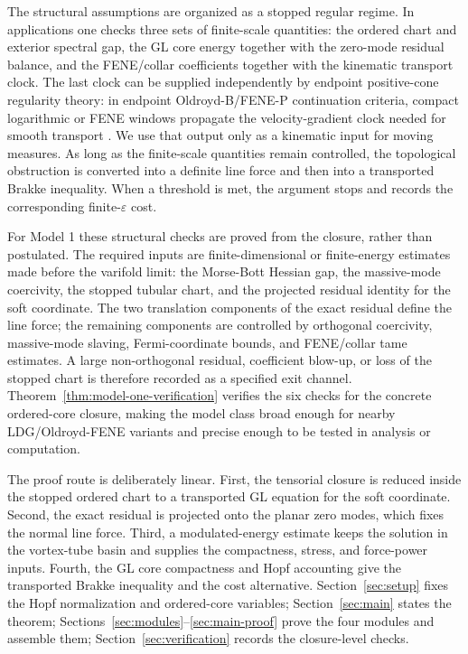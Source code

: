 \documentclass[11pt]{article}
\theoremstyle{definition}
\newcommand{\eps}{\varepsilon}
\begin{document}
The structural assumptions are organized as a stopped regular regime.  In
applications one checks three sets of finite-scale quantities: the ordered
chart and exterior spectral gap, the GL core energy together with the
zero-mode residual balance, and the FENE/collar coefficients together with the
kinematic transport clock.  The last clock can be supplied independently by
endpoint positive-cone regularity theory: in endpoint Oldroyd-B/FENE-P
continuation criteria, compact logarithmic or FENE windows propagate the
velocity-gradient clock needed for smooth transport
\cite{PengBlowUp2026,PengPositiveCone3D2026}.  We use that output only as a
kinematic input for moving measures.  As long as the finite-scale quantities
remain controlled, the topological obstruction is converted into a definite
line force and then into a transported Brakke inequality.  When a threshold is
met, the argument stops and records the corresponding finite-\(\eps\) cost.

For Model 1 these structural checks are proved from the closure, rather than
postulated.  The required inputs are finite-dimensional or finite-energy
estimates made before the varifold limit: the Morse-Bott Hessian gap, the
massive-mode coercivity, the stopped tubular chart, and the projected residual
identity for the soft coordinate.  The two translation components of the exact
residual define the line force; the remaining components are controlled by
orthogonal coercivity, massive-mode slaving, Fermi-coordinate bounds, and
FENE/collar tame estimates.  A large non-orthogonal residual, coefficient
blow-up, or loss of the stopped chart is therefore recorded as a specified exit
channel.  Theorem~\ref{thm:model-one-verification} verifies the six checks for
the concrete ordered-core closure, making the model class broad enough for
nearby LDG/Oldroyd-FENE variants and precise enough to be tested in analysis or
computation.

The proof route is deliberately linear.  First, the tensorial closure is reduced
inside the stopped ordered chart to a transported GL equation for the soft
coordinate.  Second, the exact residual is projected onto the planar zero modes,
which fixes the normal line force.  Third, a modulated-energy estimate keeps the
solution in the vortex-tube basin and supplies the compactness, stress, and
force-power inputs.  Fourth, the GL core compactness and Hopf accounting give
the transported Brakke inequality and the cost alternative.  Section~\ref{sec:setup}
fixes the Hopf normalization and ordered-core variables; Section~\ref{sec:main}
states the theorem; Sections~\ref{sec:modules}--\ref{sec:main-proof} prove the
four modules and assemble them; Section~\ref{sec:verification} records the
closure-level checks.
\end{document}
